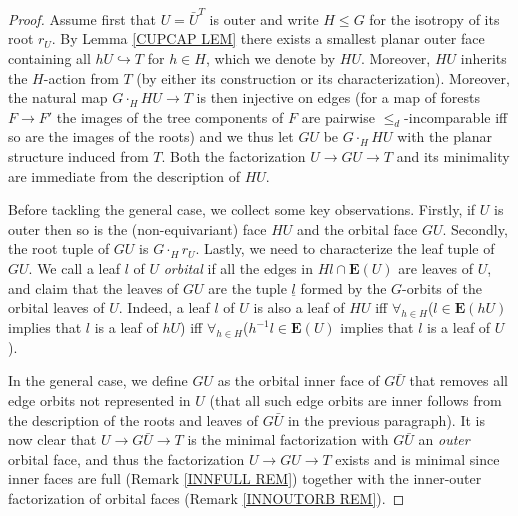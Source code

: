 \documentclass[a4paper,10pt
,draft
]{article}%
\begin{document}
\begin{proof}
Assume first that $U=\bar{U}^T$ is outer and write $H\leq G$ for
the isotropy of its root $r_U$.
By Lemma \ref{CUPCAP LEM} there exists a smallest planar outer face 
containing all $h U \hookrightarrow T$ for $h \in H$,
which we denote by $HU$.
Moreover, $HU$ inherits the $H$-action from $T$ 
(by either its construction or its characterization).
Moreover, the natural map
$G \cdot_H HU \to T$
is then injective on edges
(for a map of forests $F \to F'$
the images of the tree components of $F$ are pairwise $\leq_d$-incomparable iff so are the images of the roots)
and we thus let $GU$ be $G \cdot_H HU$
with the planar structure induced from $T$.
Both the factorization $U \to GU \to T$ and its minimality are immediate from the description of $HU$.

	Before tackling the general case, we collect some key observations.
	Firstly, if $U$ is outer then so is the (non-equivariant) face $HU$ and the orbital face $GU$.
	Secondly, the root tuple of 
	$GU$ is $G\cdot_H r_U$.
	Lastly, we need to characterize the leaf tuple of $GU$. We call a leaf $l$ of $U$ \textit{orbital} if 
all the edges in $Hl \cap \boldsymbol{E}(U)$ are leaves of $U$, 
	and claim that the leaves of $GU$ are the tuple $\underline{l}$ formed by the $G$-orbits of the orbital leaves of $U$. 
	Indeed, a leaf $l$ of $U$ is also a leaf of $HU$ iff 
	$\forall_{h \in H}$($l \in \boldsymbol{E}(hU)$ implies that $l$ is a leaf of $hU$) iff
	$\forall_{h \in H}$($h^{-1} l \in \boldsymbol{E}(U)$ implies that $l$ is a leaf of $U$).
	
	In the general case, we define $GU$ as the orbital inner face of $G \bar{U}$ that removes all edge orbits not represented in $U$ 	(that all such edge orbits are inner follows from the description of the roots and leaves of $G\bar{U}$ in the previous paragraph). 
	It is now clear that $U \to G\bar{U} \to T$ is the minimal factorization with $G\bar{U}$ an \textit{outer} orbital face,
	and thus the factorization
	$U \to GU \to T$ exists and is minimal
	since inner faces are full (Remark \ref{INNFULL REM})
	together with the inner-outer factorization of
	orbital faces (Remark \ref{INNOUTORB REM}).
\end{proof}
\end{document}
